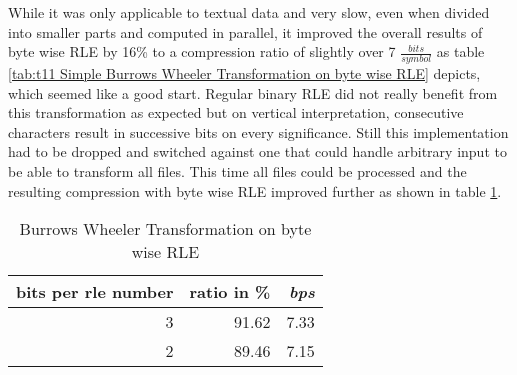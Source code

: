 \par{
While it was only applicable to textual data and very slow, even when divided into smaller parts and computed in parallel, it improved the overall results of byte wise RLE by 16\% to a compression ratio of slightly over 7 $\frac{bits}{symbol}$ as table \ref{tab:t11 Simple Burrows Wheeler Transformation on byte wise RLE} depicts, which seemed like a good start. Regular binary RLE did not really benefit from this transformation as expected but on vertical interpretation, consecutive characters result in successive bits on every significance. Still this implementation had to be dropped and switched against one that could handle arbitrary input to be able to transform all files. This time all files could be processed and the resulting compression with byte wise RLE improved further as shown in table \ref{tab:t12 Burrows Wheeler Transformation on byte wise RLE}.
\begin{table}[h]
	\centering
	\begin{tabular}{r|r|r}	
		bits per rle number & ratio in \% & \textit{bps}\\
		\hline
		3 & 91.62 & 7.33\\
		2 & 89.46 & 7.15
	\end{tabular}
	\caption{Burrows Wheeler Transformation on byte wise RLE}
	\label{tab:t12 Burrows Wheeler Transformation on byte wise RLE}
\end{table}
}

